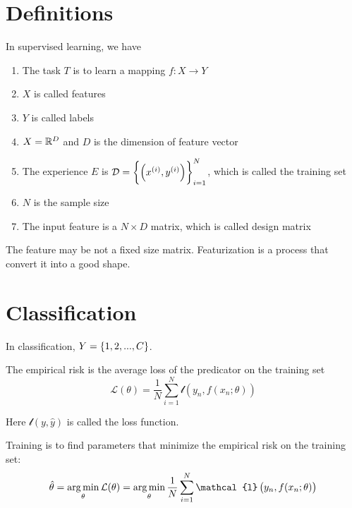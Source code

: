 \section{Definitions}

\begin{definition}
    In supervised learning, we have 
    \begin{enumerate}
        \item The task $T$ is to learn a mapping $f: X \rightarrow Y$
        \item $X$ is called features
        \item $Y$ is called labels
        \item $X = \mathbb{R}^D$ and $D$ is the dimension of feature vector
        \item The experience $E$ is $\mathcal{D} = \set{\left({x}^{(i)}, {y}^{(i)}\right)}_{i=1}^N$, which is called the training set
        \item $N$ is the sample size
        \item The input feature is a $N \times D$ matrix, which is called design matrix
    \end{enumerate}
\end{definition}



The feature may be not a fixed size matrix. Featurization is a process that convert it into a good shape.


\section{Classification}
In classification, $Y = \set{1, 2, ... , C}$.

\begin{definition}\label{empirical_risk}
    The empirical risk is the average loss of the predicator on the training set
    \begin{equation}
        \mathcal{L}(\theta) = \frac{1}{N} \sum_{i=1}^N \mathcal{l}\left( y_n, f(x_n; \theta) \right)
    \end{equation}
    
    Here $\mathcal{l}(y, \hat{y})$ is called the loss function.
\end{definition}

\begin{definition}[Training]
    Training is to find parameters that minimize the empirical risk on the training set:
    \begin{equation}
        \hat{\theta} = \argmin{\theta}\mathcal{L}(\theta) = \argmin{\theta} \frac{1}{N} \sum_{i=1}^N \mathcal{l}\left( y_n, f(x_n; \theta) \right)
    \end{equation}
\end{definition}

